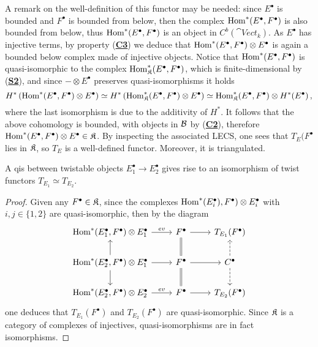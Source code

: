 A remark on the well-definition of this functor may be needed:
since $E^{\bullet}$ is bounded and $F^{\bullet}$ is bounded from below,
then the complex $\operatorname{Hom}^{*}(E^{\bullet},F^{\bullet})$ is also 
bounded from below, thus $\operatorname{Hom}^{*}(E^{\bullet},F^{\bullet})$
is an object in $C^{b}(\cat{Vect}_{k})$.
As $E^{\bullet}$ has injective terms, by property (\hyperref[C3]{\textbf{C3}}) 
we deduce that $\operatorname{Hom}^{*}(E^{\bullet},F^{\bullet}) \otimes E^{\bullet}$
is again a bounded below complex made of injective objects.
Notice that $\operatorname{Hom}^{*}(E^{\bullet},F^{\bullet})$ is quasi-isomorphic
to the complex $\operatorname{Hom}^{*}_{\mathfrak{K}}(E^{\bullet},F^{\bullet})$,
which is finite-dimensional by (\hyperref[S2]{\textbf{S2}}),
and since $- \otimes E^{\bullet}$ preserves quasi-isomorphisms
it holds
\begin{equation*}
	H^{*}\left( \operatorname{Hom}^{*}(E^{\bullet},F^{\bullet}) \otimes E^{\bullet} \right)
	\simeq H^{*}\left( \operatorname{Hom}^{*}_{\mathfrak{K}}(E^{\bullet},F^{\bullet}) \otimes E^{\bullet} \right)
	\simeq \operatorname{Hom}^{*}_{\mathfrak{K}}(E^{\bullet},F^{\bullet}) \otimes H^*(E^{\bullet})\,,
\end{equation*}
where the last isomorphism is due to the additivity of $H^{*}$.
It follows that the above cohomology is bounded, with objects in $\mathcal{B}$
by (\hyperref[C2]{\textbf{C2}}), 
therefore $\operatorname{Hom}^{*}(E^{\bullet},F^{\bullet}) \otimes E^{\bullet} \in \mathfrak{K}$.
By inspecting the associated LECS, one sees that $T_{E}(F^{\bullet}$ lies in $\mathfrak{K}$,
so $T_{E}$ is a well-defined functor. Moreover, it is triangulated.


\begin{prop}
	A qis between twistable objects $E_{1}^{\bullet} \to E_{2}^{\bullet}$
	gives rise to an isomorphism of twist functors $T_{E_{1}} \simeq T_{E_{2}}$.
	\begin{proof}
		Given any $F^{\bullet} \in \mathfrak{K}$, 
		since the complexes $\operatorname{Hom}^{*}(E_{i}^{\bullet}),F^{\bullet}) \otimes E_{i}^{\bullet}$
		with $i,j \in \{1,2\}$ are quasi-isomorphic, then by the diagram
		\begin{equation*}
			\begin{tikzcd}
				\Hom^{*}(E_{1}^{\bullet},F^{\bullet}) \otimes E_{1}^{\bullet} \ar[r, "ev"]
				& F^{\bullet} \ar[r] \ar[d, equals]
				& T_{E_{1}}(F^{\bullet}) \\
				\Hom^{*}(E_{2}^{\bullet},F^{\bullet}) \otimes E_{1}^{\bullet} \ar[r] \ar[u] \ar[d]
				& F^{\bullet} \ar[r] \ar[d, equals]
				& C^{\bullet} \ar[u, dashed] \ar[d, dashed] \\
				\Hom^{*}(E_{2}^{\bullet},F^{\bullet}) \otimes E_{2}^{\bullet} \ar[r, "ev"]
				& F^{\bullet} \ar[r]
				& T_{E_{2}}(F^{\bullet}) 
			\end{tikzcd}
		\end{equation*}
		one deduces that $T_{E_{1}}(F^{\bullet})$ and $T_{E_{2}}(F^{\bullet})$
		are quasi-isomorphic. Since $\mathfrak{K}$ is a category of complexes of injectives,
		quasi-isomorphisms are in fact isomorphisms.
	\end{proof}
\end{prop}

